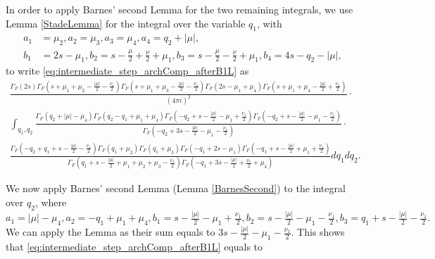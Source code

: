 \documentclass[11pt, reqno]{amsart}
\theoremstyle{plain}
\theoremstyle{definition}
\theoremstyle{remark}
\theoremstyle{plain}
\begin{document}
In order to apply Barnes' second Lemma for the two remaining integrals, we use Lemma \ref{StadeLemma} for the integral over the variable $q_1$, with  
    \begin{align*}
        a_1 &= \mu_2,a_2 = \mu_3,a_3=\mu_4,a_4= q_2 + |\mu|, \\  b_1 &= 2s-\mu_1,b_2 = s - \tfrac{\mu}{2} + \tfrac{\nu}{2} + \mu_1 ,b_3 = s - \tfrac{\mu}{2} - \tfrac{\nu}{2} + \mu_1 ,b_4 = 4s-q_2-|\mu|,  
    \end{align*} 
to write \eqref{eq:intermediate_step_archComp_afterB1L} as 
\small
\begin{align*}
    \frac{ \Gamma_F(2s)\Gamma_F(s + \mu_1 + \mu_2 - \tfrac{|\mu|}{2}-\tfrac{\nu_1}{2})\Gamma_F(s + \mu_1 + \mu_3 - \tfrac{|\mu|}{2}-\tfrac{\nu_1}{2})\Gamma_F(2s-\mu_1 + \mu_4)\Gamma_F(s + \mu_1 + \mu_4 - \tfrac{|\mu|}{2}+\tfrac{\nu_1}{2})}{(4\pi i)^2} \cdot \\ \int_{q_1,q_2} \frac{\Gamma_F(q_2+|\mu|-\mu_4)\Gamma_F(q_2 - q_1 + \mu_1 +\mu_4) \Gamma_F(-q_2+s - \tfrac{|\mu|}{2} - \mu_1 +\tfrac{\nu_1}{2})\Gamma_F(-q_2+s - \tfrac{|\mu|}{2} - \mu_1 -\tfrac{\nu_1}{2})}{\Gamma_F(-q_2 + 3s -  \tfrac{|\mu|}{2} - \mu_1 -\tfrac{\nu_1}{2})} \cdot \\ \frac{\Gamma_F(-q_2 + q_1 + s - \tfrac{|\mu|}{2} - \tfrac{\nu_1}{2}) \Gamma_F(q_1 + \mu_2)  \Gamma_F(q_1 + \mu_3)\Gamma_F(-q_1 + 2s - \mu_1) \Gamma_F(-q_1 + s -  \tfrac{|\mu|}{2} + \mu_1 +\tfrac{\nu_1}{2}) }{\Gamma_F(q_1 + s -  \tfrac{|\mu|}{2} + \mu_1 + \mu_2 + \mu_3 -\tfrac{\nu_1}{2})\Gamma_F(-q_1+ 3s - \tfrac{|\mu|}{2} + \tfrac{\nu_1}{2} + \mu_4)} dq_1 dq_2.
\end{align*}
\normalsize

We now apply Barnes' second Lemma (Lemma \ref{BarnesSecond}) to the integral over $q_2$, where
$$a_1= |\mu|-\mu_4, a_2=- q_1 + \mu_1 +\mu_4,b_1=s - \tfrac{|\mu|}{2} - \mu_1 +\tfrac{\nu_1}{2},b_2=s - \tfrac{|\mu|}{2} - \mu_1 -\tfrac{\nu_1}{2},b_3 = q_1 + s - \tfrac{|\mu|}{2} - \tfrac{\nu_1}{2}.$$
We can apply the Lemma as their sum equals to $ 3s -  \tfrac{|\mu|}{2} - \mu_1 -\tfrac{\nu_1}{2}$. This shows that \eqref{eq:intermediate_step_archComp_afterB1L} equals to
\end{document}
